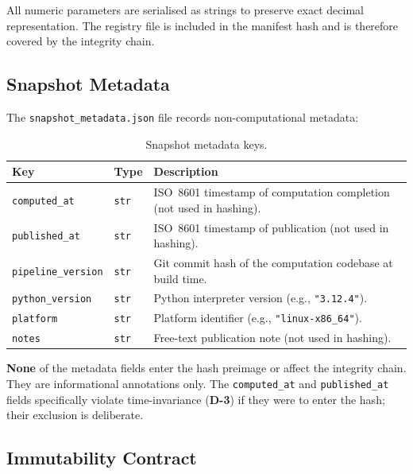 All numeric parameters are serialised as strings to preserve exact decimal
representation.  The registry file is included in the manifest hash and is
therefore covered by the integrity chain.

\subsection{Snapshot Metadata}\label{sec:snapshot:metadata}

The \texttt{snapshot\_metadata.json} file records non-computational metadata:

\begin{table}[htbp]
  \centering\small
  \caption{Snapshot metadata keys.}\label{tab:snapshot-metadata-keys}
  \begin{tabularx}{\textwidth}{@{}l l X@{}}
    \toprule
    \textbf{Key} & \textbf{Type} & \textbf{Description} \\
    \midrule
    \texttt{computed\_at}   & \texttt{str} & ISO~8601 timestamp of computation
      completion (not used in hashing). \\
    \texttt{published\_at}  & \texttt{str} & ISO~8601 timestamp of publication
      (not used in hashing). \\
    \texttt{pipeline\_version} & \texttt{str} & Git commit hash of the
      computation codebase at build time. \\
    \texttt{python\_version}   & \texttt{str} & Python interpreter version
      (e.g., \texttt{"3.12.4"}). \\
    \texttt{platform}          & \texttt{str} & Platform identifier
      (e.g., \texttt{"linux-x86\_64"}). \\
    \texttt{notes}             & \texttt{str} & Free-text publication note
      (not used in hashing). \\
    \bottomrule
  \end{tabularx}
\end{table}

\textbf{None} of the metadata fields enter the hash preimage or affect the
integrity chain.  They are informational annotations only.  The
\texttt{computed\_at} and \texttt{published\_at} fields specifically violate
time-invariance (\textbf{D-3}) if they were to enter the hash; their
exclusion is deliberate.

\subsection{Immutability Contract}\label{sec:snapshot:immutability}

